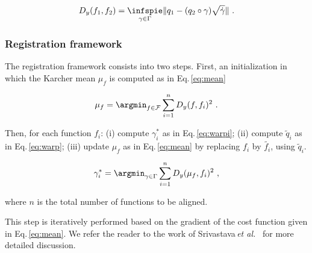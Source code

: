 \begin{equation}
  D_y(f_1, f_2) = \underset{\gamma \in \Gamma}{\infspie} \| q_1 - (q_2 \circ \gamma) \sqrt{\dot{\gamma}} \| \ .
  \label{eq:cf}
\end{equation}

\subsubsection{Registration framework}\label{sec:regfra}

The registration framework consists into two steps. First, an initialization in which the Karcher mean $\mu_f$ is computed as in Eq.\,\eqref{eq:mean}

\begin{equation}
  \mu_f = \argmin_{f \in \mathcal{F}} \sum_{i = 1}^{n} D_y(f, f_i)^2 \ .
  \label{eq:mean}
\end{equation}

Then, for each function $f_i$: 
(i) compute $\gamma_{i}^{*}$ as in Eq.\,\eqref{eq:warpi}; 
(ii) compute $\tilde{q}_i$ as in Eq.\,\eqref{eq:warp};
(iii) update $\mu_f$ as in Eq.\,\eqref{eq:mean} by replacing $f_i$ by $\tilde{f_i}$, using $\tilde{q}_i$.

\begin{equation}
  \gamma_{i}^{*} = \argmin_{\gamma \in \Gamma} \sum_{i = 1}^{n} D_y(\mu_f, f_i)^2 \ ,
  \label{eq:warpi}
\end{equation}

\noindent where $n$ is the total number of functions to be aligned.

This step is iteratively performed based on the gradient of the cost function given in Eq.\,\eqref{eq:mean}. We refer the reader to the work of Srivastava\,\textit{et al.}~\cite{Srivastava2011} for more detailed discussion.


